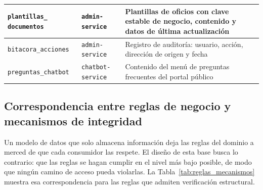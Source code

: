 \begin{longtable}{|p{3.5cm}|p{3.1cm}|p{7.5cm}|}
		\texttt{plantillas\_} \texttt{documentos} & \texttt{admin-service} & Plantillas de oficios
		con clave estable de negocio, contenido y datos de última actualización \\ \hline
	
		\texttt{bitacora\_acciones} & \texttt{admin-service} & Registro de auditoría: usuario, acción,
		dirección de origen y fecha \\ \hline
	
		\texttt{preguntas\_chatbot} & \texttt{chatbot-\allowbreak service} & Contenido del menú de preguntas
		frecuentes del portal público \\ \hline
	\end{longtable}
	
	\normalsize
	
	\subsection{Correspondencia entre reglas de negocio y mecanismos de integridad}
	Un modelo de datos que solo almacena información deja las reglas del dominio a merced de que
	cada consumidor las respete. El diseño de esta base busca lo contrario: que las reglas se hagan
	cumplir en el nivel más bajo posible, de modo que ningún camino de acceso pueda violarlas. La
	Tabla~\ref{tab:reglas_mecanismos} muestra esa correspondencia para las reglas que admiten
	verificación estructural.
	
	\small
	\renewcommand{\arraystretch}{1.2}
	

